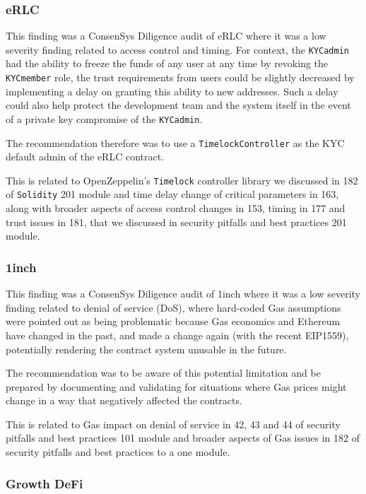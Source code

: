 \subsubsection{eRLC}\label{erlc}

This finding was a ConsenSys Diligence audit of eRLC where it was a low
severity finding related to access control and timing. For context, the
\texttt{KYCadmin} had the ability to freeze the funds of any user at any
time by revoking the \texttt{KYCmember} role, the trust requirements
from users could be slightly decreased by implementing a delay on
granting this ability to new addresses. Such a delay could also help
protect the development team and the system itself in the event of a
private key compromise of the \texttt{KYCadmin}.

The recommendation therefore was to use a \texttt{TimelockController} as
the KYC default admin of the eRLC contract.

This is related to OpenZeppelin's \texttt{Timelock} controller library
we discussed in 182 of \texttt{Solidity} 201 module and time delay
change of critical parameters in 163, along with broader aspects of
access control changes in 153, timing in 177 and trust issues in 181,
that we discussed in security pitfalls and best practices 201 module.

\subsubsection{1inch}\label{inch}

This finding was a ConsenSys Diligence audit of 1inch where it was a low
severity finding related to denial of service (DoS), where hard-coded
Gas assumptions were pointed out as being problematic because Gas
economics and Ethereum have changed in the past, and made a change again
(with the recent EIP1559), potentially rendering the contract system
unusable in the future.

The recommendation was to be aware of this potential limitation and be
prepared by documenting and validating for situations where Gas prices
might change in a way that negatively affected the contracts.

This is related to Gas impact on denial of service in 42, 43 and 44 of
security pitfalls and best practices 101 module and broader aspects of
Gas issues in 182 of security pitfalls and best practices to a one
module.

\subsubsection{Growth DeFi}\label{growth-defi}

